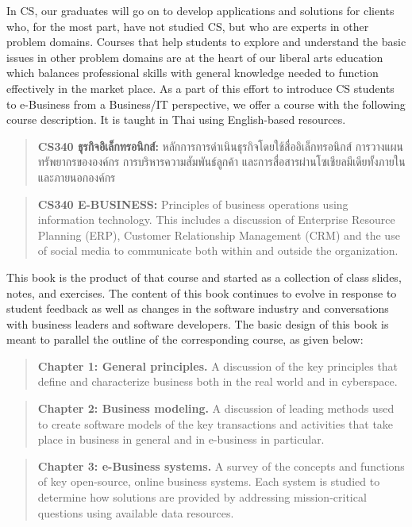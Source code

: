 \documentclass[]{book}
\begin{document}
In CS, our graduates will go on to develop applications and solutions for clients who, for the most part, have not studied CS, but who are experts in other problem domains. Courses that help students to explore and understand the basic issues in other problem domains are at the heart of our liberal arts education which balances professional skills with general knowledge needed to function effectively in the market place.
As a part of this effort to introduce CS students to e-Business from a Business/IT perspective, we offer a course with the following course description. It is taught in Thai using English-based resources.

\begin{quote}
\textbf{CS340 ธุรกิจอิเล็กทรอนิกส์:} หลักการการดำเนินธุรกิจโดยใช้สื่ออิเล็กทรอนิกส์ การวางแผนทรัพยากรขององค์กร การบริหารความสัมพันธ์ลูกค้า และการสื่อสารผ่านโซเชียลมีเดียทั้งภายในและภายนอกองค์กร
\end{quote}

\begin{quote}
\textbf{CS340 E-BUSINESS:} Principles of business operations using information technology. This includes a discussion of Enterprise Resource Planning (ERP), Customer Relationship Management (CRM) and the use of social media to communicate both within and outside the organization.
\end{quote}

This book is the product of that course and started as a collection of class slides, notes, and exercises. The content of this book continues to evolve in response to student feedback as well as changes in the software industry and conversations with business leaders and software developers. The basic design of this book is meant to parallel the outline of the corresponding course, as given below:

\begin{quote}
\textbf{Chapter 1: General principles.} A discussion of the key principles that define and characterize business both in the real world and in cyberspace.
\end{quote}

\begin{quote}
\textbf{Chapter 2: Business modeling.} A discussion of leading methods used to create software models of the key transactions and activities that take place in business in general and in e-business in particular.
\end{quote}

\begin{quote}
\textbf{Chapter 3: e-Business systems.} A survey of the concepts and functions of key open-source, online business systems. Each system is studied to determine how solutions are provided by addressing mission-critical questions using available data resources.
\end{quote}
\end{document}
